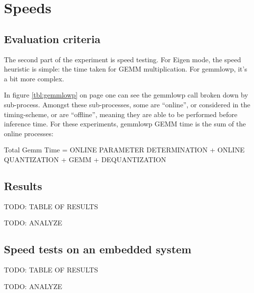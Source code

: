 \section{Speeds}
\subsection{Evaluation criteria}
The second part of the experiment is speed testing. For Eigen mode, the speed heuristic is simple: the time taken for GEMM multiplication. For gemmlowp, it's a bit more complex.

In figure \ref{tbl:gemmlowp} on page \pageref{tbl:gemmlowp} one can see the gemmlowp call broken down by sub-process. Amongst these sub-processes, some are ``online'', or considered in the timing-scheme, or are ``offline'', meaning they are able to be performed before inference time. For these experiments, gemmlowp GEMM time is the sum of the online processes:

Total Gemm Time = ONLINE PARAMETER DETERMINATION + ONLINE QUANTIZATION + GEMM + DEQUANTIZATION

\subsection{Results}
TODO: TABLE OF RESULTS

TODO: ANALYZE

\subsection{Speed tests on an embedded system}
TODO: TABLE OF RESULTS

TODO: ANALYZE